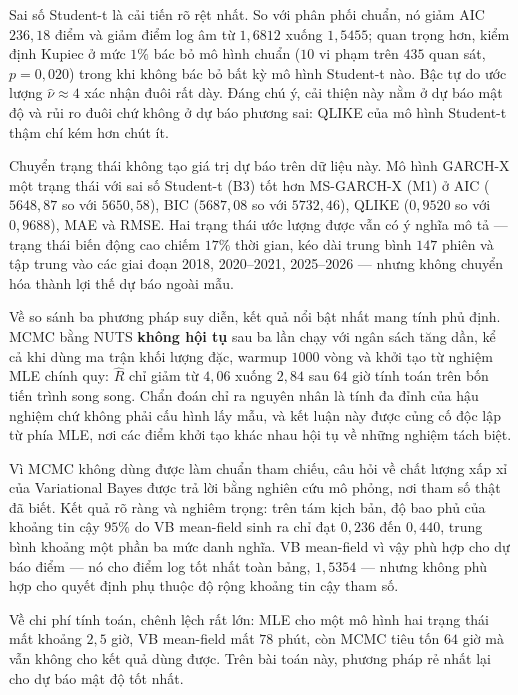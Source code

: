 \documentclass[12pt,a4paper]{article}
\numberwithin{equation}{section}
\begin{document}
Sai số Student-t là cải tiến rõ rệt nhất. So với phân phối chuẩn, nó giảm AIC $236{,}18$ điểm và giảm điểm log âm từ $1{,}6812$ xuống $1{,}5455$; quan trọng hơn, kiểm định Kupiec ở mức $1\%$ bác bỏ mô hình chuẩn ($10$ vi phạm trên $435$ quan sát, $p=0{,}020$) trong khi không bác bỏ bất kỳ mô hình Student-t nào. Bậc tự do ước lượng $\hat\nu\approx4$ xác nhận đuôi rất dày. Đáng chú ý, cải thiện này nằm ở dự báo mật độ và rủi ro đuôi chứ không ở dự báo phương sai: QLIKE của mô hình Student-t thậm chí kém hơn chút ít.

Chuyển trạng thái không tạo giá trị dự báo trên dữ liệu này. Mô hình GARCH-X một trạng thái với sai số Student-t (B3) tốt hơn MS-GARCH-X (M1) ở AIC ($5648{,}87$ so với $5650{,}58$), BIC ($5687{,}08$ so với $5732{,}46$), QLIKE ($0{,}9520$ so với $0{,}9688$), MAE và RMSE. Hai trạng thái ước lượng được vẫn có ý nghĩa mô tả --- trạng thái biến động cao chiếm $17\%$ thời gian, kéo dài trung bình $147$ phiên và tập trung vào các giai đoạn 2018, 2020--2021, 2025--2026 --- nhưng không chuyển hóa thành lợi thế dự báo ngoài mẫu.

Về so sánh ba phương pháp suy diễn, kết quả nổi bật nhất mang tính phủ định. MCMC bằng NUTS \textbf{không hội tụ} sau ba lần chạy với ngân sách tăng dần, kể cả khi dùng ma trận khối lượng đặc, warmup $1000$ vòng và khởi tạo từ nghiệm MLE chính quy: $\widehat R$ chỉ giảm từ $4{,}06$ xuống $2{,}84$ sau $64$ giờ tính toán trên bốn tiến trình song song. Chẩn đoán chỉ ra nguyên nhân là tính đa đỉnh của hậu nghiệm chứ không phải cấu hình lấy mẫu, và kết luận này được củng cố độc lập từ phía MLE, nơi các điểm khởi tạo khác nhau hội tụ về những nghiệm tách biệt.

Vì MCMC không dùng được làm chuẩn tham chiếu, câu hỏi về chất lượng xấp xỉ của Variational Bayes được trả lời bằng nghiên cứu mô phỏng, nơi tham số thật đã biết. Kết quả rõ ràng và nghiêm trọng: trên tám kịch bản, độ bao phủ của khoảng tin cậy $95\%$ do VB mean-field sinh ra chỉ đạt $0{,}236$ đến $0{,}440$, trung bình khoảng một phần ba mức danh nghĩa. VB mean-field vì vậy phù hợp cho dự báo điểm --- nó cho điểm log tốt nhất toàn bảng, $1{,}5354$ --- nhưng không phù hợp cho quyết định phụ thuộc độ rộng khoảng tin cậy tham số.

Về chi phí tính toán, chênh lệch rất lớn: MLE cho một mô hình hai trạng thái mất khoảng $2{,}5$ giờ, VB mean-field mất $78$ phút, còn MCMC tiêu tốn $64$ giờ mà vẫn không cho kết quả dùng được. Trên bài toán này, phương pháp rẻ nhất lại cho dự báo mật độ tốt nhất.
\end{document}
